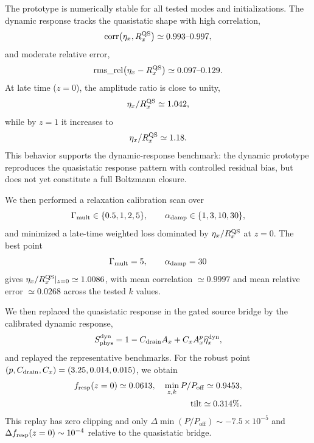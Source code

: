 ﻿\documentclass[11pt,prd,preprint,nofootinbib,amsmath,amssymb]{revtex4-2}
\begin{document}
The prototype is numerically stable for all tested modes and initializations. The dynamic response tracks the quasistatic shape with high correlation,
\begin{equation}
{\rm corr}\!\left(\eta_x,R_x^{\rm QS}\right)\simeq0.993\text{--}0.997,
\end{equation}
and moderate relative error,
\begin{equation}
{\rm rms\_rel}\!\left(\eta_x-R_x^{\rm QS}\right)\simeq0.097\text{--}0.129.
\end{equation}
At late time ($z=0$), the amplitude ratio is close to unity,
\begin{equation}
\eta_x/R_x^{\rm QS}\simeq1.042,
\end{equation}
while by $z=1$ it increases to
\begin{equation}
\eta_x/R_x^{\rm QS}\simeq1.18.
\end{equation}
This behavior supports the dynamic-response benchmark: the dynamic prototype reproduces the quasistatic response pattern with controlled residual bias, but does not yet constitute a full Boltzmann closure.

We then performed a relaxation calibration scan over
\begin{equation}
\Gamma_{\rm mult}\in\{0.5,1,2,5\},
\qquad
\alpha_{\rm damp}\in\{1,3,10,30\},
\end{equation}
and minimized a late-time weighted loss dominated by $\eta_x/R_x^{\rm QS}$ at $z=0$. The best point
\begin{equation}
\Gamma_{\rm mult}=5,\qquad \alpha_{\rm damp}=30
\end{equation}
gives $\eta_x/R_x^{\rm QS}|_{z=0}\simeq1.0086$, with mean correlation $\simeq0.9997$ and mean relative error $\simeq0.0268$ across the tested $k$ values.

We then replaced the quasistatic response in the gated source bridge by the
calibrated dynamic response,
\begin{equation}
S_{\rm phys}^{\rm dyn}
=
1-C_{\rm drain}A_x
+C_xA_x^p\widehat\eta_x^{\rm dyn},
\end{equation}
and replayed the representative benchmarks. For the robust point $(p,C_{\rm drain},C_x)=(3.25,0.014,0.015)$, we obtain
\begin{equation}
\begin{aligned}
f_{\rm resp}(z=0)\simeq0.0613,\quad
\min_{z,k}P/P_{\mathrm{off}}\simeq0.9453,
\\
\mathrm{tilt}\simeq0.314\%.
\end{aligned}
\end{equation}
This replay has zero clipping and only
$\Delta\min(P/P_{\mathrm{off}})\sim-7.5\times10^{-5}$ and
$\Delta f_{\rm resp}(z=0)\sim10^{-4}$ relative to the quasistatic bridge.
\end{document}
